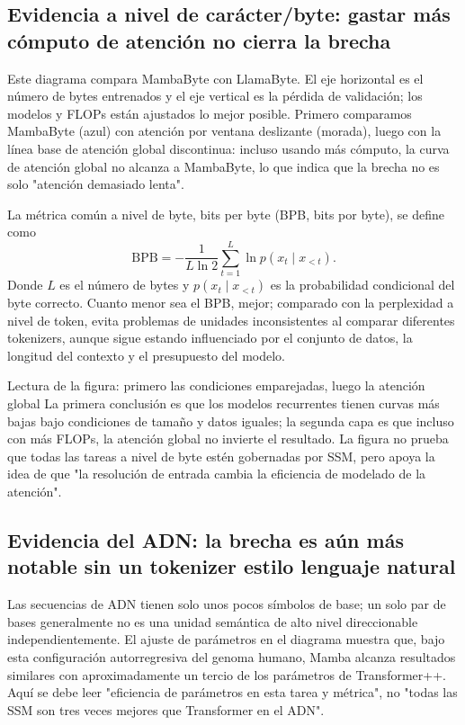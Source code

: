 \subsection{Evidencia a nivel de carácter/byte: gastar más cómputo de atención no cierra la brecha}

Este diagrama compara MambaByte con LlamaByte. El eje horizontal es el número de bytes entrenados y el eje vertical es la pérdida de validación; los modelos y FLOPs están ajustados lo mejor posible. Primero comparamos MambaByte (azul) con atención por ventana deslizante (morada), luego con la línea base de atención global discontinua: incluso usando más cómputo, la curva de atención global no alcanza a MambaByte, lo que indica que la brecha no es solo "atención demasiado lenta".


La métrica común a nivel de byte, bits per byte (BPB, bits por byte), se define como
\[
\mathrm{BPB}=-\frac{1}{L\ln 2}\sum_{t=1}^{L}\ln p(x_t\mid x_{<t}).
\]
Donde $L$ es el número de bytes y $p(x_t\mid x_{<t})$ es la probabilidad condicional del byte correcto. Cuanto menor sea el BPB, mejor; comparado con la perplexidad a nivel de token, evita problemas de unidades inconsistentes al comparar diferentes tokenizers, aunque sigue estando influenciado por el conjunto de datos, la longitud del contexto y el presupuesto del modelo.

\begin{knowledgebox}{Lectura de la figura: primero las condiciones emparejadas, luego la atención global}
La primera conclusión es que los modelos recurrentes tienen curvas más bajas bajo condiciones de tamaño y datos iguales; la segunda capa es que incluso con más FLOPs, la atención global no invierte el resultado. La figura no prueba que todas las tareas a nivel de byte estén gobernadas por SSM, pero apoya la idea de que "la resolución de entrada cambia la eficiencia de modelado de la atención".
\end{knowledgebox}

\subsection{Evidencia del ADN: la brecha es aún más notable sin un tokenizer estilo lenguaje natural}

Las secuencias de ADN tienen solo unos pocos símbolos de base; un solo par de bases generalmente no es una unidad semántica de alto nivel direccionable independientemente. El ajuste de parámetros en el diagrama muestra que, bajo esta configuración autorregresiva del genoma humano, Mamba alcanza resultados similares con aproximadamente un tercio de los parámetros de Transformer++. Aquí se debe leer "eficiencia de parámetros en esta tarea y métrica", no "todas las SSM son tres veces mejores que Transformer en el ADN".

